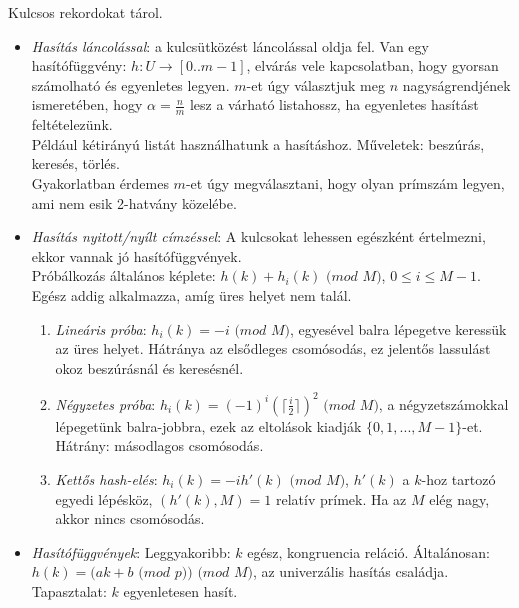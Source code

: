 \documentclass[margin=0px]{article}
\begin{document}
Kulcsos rekordokat tárol.
\begin{itemize}
    \item \textit{Hasítás láncolással}: a kulcsütközést láncolással oldja fel. Van egy hasítófüggvény: $h: U \to [0..m-1]$, elvárás vele kapcsolatban, hogy gyorsan számolható és egyenletes legyen. $m$-et úgy választjuk meg $n$ nagyságrendjének ismeretében, hogy $\alpha = \frac{n}{m}$ lesz a várható listahossz, ha egyenletes hasítást feltételezünk.\\
          Például kétirányú listát használhatunk a hasításhoz. Műveletek: beszúrás, keresés, törlés. \\
          Gyakorlatban érdemes $m$-et úgy megválasztani, hogy olyan prímszám legyen, ami nem esik 2-hatvány közelébe.
    \item \textit{Hasítás nyitott/nyílt címzéssel}: A kulcsokat lehessen egészként értelmezni, ekkor vannak jó hasítófüggvények. \\
          Próbálkozás általános képlete: $h(k) + h_i(k)$ $(mod$ $M)$, $0 \leq i \leq M-1$. Egész addig alkalmazza, amíg üres helyet nem talál.
          \begin{enumerate}
              \item \textit{Lineáris próba}: $h_i(k) = -i$ $(mod$ $M)$, egyesével balra lépegetve keressük az üres helyet. Hátránya az elsődleges csomósodás, ez jelentős lassulást okoz beszúrásnál és keresésnél.
              \item \textit{Négyzetes próba}: $h_i(k) = (-1)^i(\lceil\frac{i}{2}\rceil)^2$ $(mod$ $M)$, a négyzetszámokkal lépegetünk balra-jobbra, ezek az eltolások kiadják $\{0,1,...,M-1\}$-et. Hátrány: másodlagos csomósodás.
              \item \textit{Kettős hash-elés}: $h_i(k) =-ih'(k)$ $(mod$ $M)$, $h'(k)$ a $k$-hoz tartozó egyedi lépésköz, $(h'(k),M)=1$ relatív prímek. Ha az $M$ elég nagy, akkor nincs csomósodás.
          \end{enumerate}
    \item \textit{Hasítófüggvények}: Leggyakoribb: $k$ egész, kongruencia reláció. Általánosan: $h(k) = (ak +b$ $(mod$ $p))$ $(mod$ $M)$, az univerzális hasítás családja. Tapasztalat: $k$ egyenletesen hasít.
\end{itemize}
\end{document}
